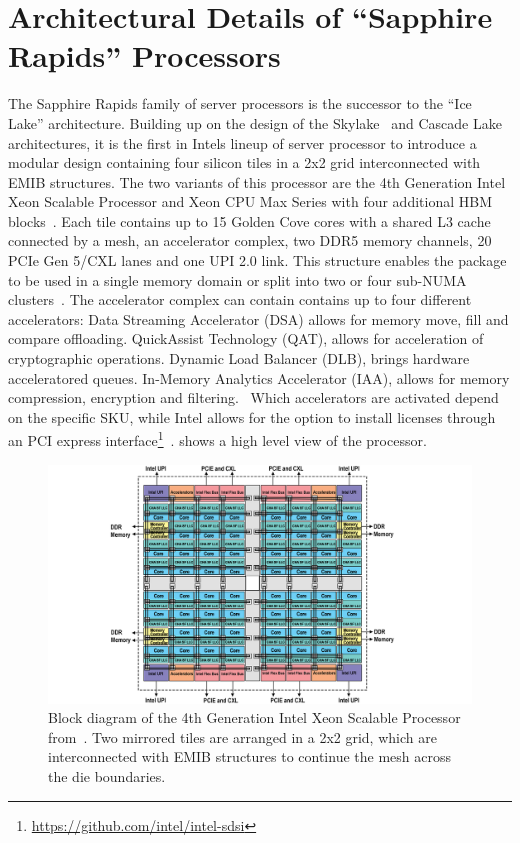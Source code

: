 \chapter{Architectural Details of ``Sapphire Rapids'' Processors}
The Sapphire Rapids family of server processors is the successor to the ``Ice Lake'' architecture.
Building up on the design of the Skylake~\cite{Schoene_2019_SKL} and Cascade Lake~\cite{Velten_2022_Rome_CLX} architectures, it is the first in Intels lineup of server processor to introduce a modular design containing four silicon tiles in a 2x2 grid interconnected with EMIB structures.
The two variants of this processor are the 4th Generation Intel Xeon Scalable Processor and Xeon CPU Max Series with four additional HBM blocks~\cite{Intel_2021_Hotchips}.
Each tile contains up to 15 Golden Cove cores with a shared L3 cache connected by a mesh, an accelerator complex, two DDR5 memory channels, 20 PCIe Gen 5/CXL lanes and one UPI 2.0 link.
This structure enables the package to be used in a single memory domain or split into two or four sub-NUMA clusters~\cite{Intel_4th_gen_scalable}.
The accelerator complex can contain contains up to four different accelerators:
Data Streaming Accelerator (DSA) allows for memory move, fill and compare offloading.
QuickAssist Technology (QAT), allows for acceleration of cryptographic operations.
Dynamic Load Balancer (DLB), brings hardware acceleratored queues.
In-Memory Analytics Accelerator (IAA), allows for memory compression, encryption and filtering.~\cite{Yifan_2024_intel_accelerator_ecosystem,Yuan_2023_ISCA_tutorial,Intel_4th_gen_scalable}
Which accelerators are activated depend on the specific SKU, while Intel allows for the option to install licenses through an PCI express interface\footnote{\url{https://github.com/intel/intel-sdsi}}~\cite{Krenn_2025_Intel_on_demand}.
 shows a high level view of the processor.

\begin{figure}[]
    \centering
    \includegraphics[width=\columnwidth]{fig/spr-uma.png}
    \caption{\label{fig:spr-overview}Block diagram of the 4th Generation Intel Xeon Scalable Processor from~\cite{Intel_4th_gen_scalable}.
Two mirrored tiles are arranged in a 2x2 grid, which are interconnected with EMIB structures to continue the mesh across the die boundaries.~\cite{Intel_2022_ISSCC}}
\end{figure}

